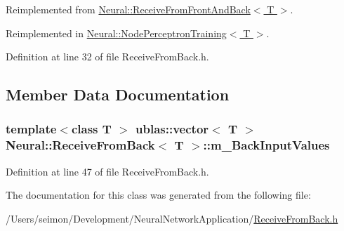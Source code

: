 Reimplemented from \hyperlink{class_neural_1_1_receive_from_front_and_back_aedc1e9175278a87a6b5954b727669d4b}{Neural::ReceiveFromFrontAndBack$<$ T $>$}.



Reimplemented in \hyperlink{class_neural_1_1_node_perceptron_training_afe3d66a4f1149b7df640b99dc1919f28}{Neural::NodePerceptronTraining$<$ T $>$}.



Definition at line 32 of file ReceiveFromBack.h.



\subsection{Member Data Documentation}
\hypertarget{class_neural_1_1_receive_from_back_a39008175a506f3f17d8459a9caa45f59}{
\subsubsection[{m\_\-BackInputValues}]{\setlength{\rightskip}{0pt plus 5cm}template$<$class T $>$ ublas::vector$<$ T $>$ {\bf Neural::ReceiveFromBack}$<$ T $>$::{\bf m\_\-BackInputValues}}}
\label{class_neural_1_1_receive_from_back_a39008175a506f3f17d8459a9caa45f59}


Definition at line 47 of file ReceiveFromBack.h.



The documentation for this class was generated from the following file:\begin{DoxyCompactItemize}
\item 
/Users/seimon/Development/NeuralNetworkApplication/\hyperlink{_receive_from_back_8h}{ReceiveFromBack.h}\end{DoxyCompactItemize}
